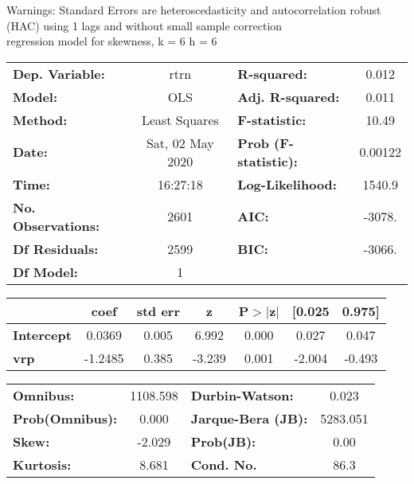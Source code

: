 Warnings: \newline
 [1] Standard Errors are heteroscedasticity and autocorrelation robust (HAC) using 1 lags and without small sample correction\\ 

regression model for skewness, k = 6 h = 6\begin{center}
\begin{tabular}{lclc}
\toprule
\textbf{Dep. Variable:}    &       rtrn       & \textbf{  R-squared:         } &     0.012   \\
\textbf{Model:}            &       OLS        & \textbf{  Adj. R-squared:    } &     0.011   \\
\textbf{Method:}           &  Least Squares   & \textbf{  F-statistic:       } &     10.49   \\
\textbf{Date:}             & Sat, 02 May 2020 & \textbf{  Prob (F-statistic):} &  0.00122    \\
\textbf{Time:}             &     16:27:18     & \textbf{  Log-Likelihood:    } &    1540.9   \\
\textbf{No. Observations:} &        2601      & \textbf{  AIC:               } &    -3078.   \\
\textbf{Df Residuals:}     &        2599      & \textbf{  BIC:               } &    -3066.   \\
\textbf{Df Model:}         &           1      & \textbf{                     } &             \\
\bottomrule
\end{tabular}
\begin{tabular}{lcccccc}
                   & \textbf{coef} & \textbf{std err} & \textbf{z} & \textbf{P$> |$z$|$} & \textbf{[0.025} & \textbf{0.975]}  \\
\midrule
\textbf{Intercept} &       0.0369  &        0.005     &     6.992  &         0.000        &        0.027    &        0.047     \\
\textbf{vrp}       &      -1.2485  &        0.385     &    -3.239  &         0.001        &       -2.004    &       -0.493     \\
\bottomrule
\end{tabular}
\begin{tabular}{lclc}
\textbf{Omnibus:}       & 1108.598 & \textbf{  Durbin-Watson:     } &    0.023  \\
\textbf{Prob(Omnibus):} &   0.000  & \textbf{  Jarque-Bera (JB):  } & 5283.051  \\
\textbf{Skew:}          &  -2.029  & \textbf{  Prob(JB):          } &     0.00  \\
\textbf{Kurtosis:}      &   8.681  & \textbf{  Cond. No.          } &     86.3  \\
\bottomrule
\end{tabular}
\end{center}

